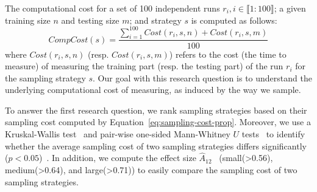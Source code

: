 The computational cost for a set of 100 independent runs $r_{i}, i \in \llbracket 1:100 \rrbracket$; a given training size $n$ and testing size $m$; and strategy $s$ is computed as follows:
\begin{equation}
    CompCost(s) = \frac{\sum_{i=1}^{100} Cost(r_{i}, s, n) + Cost(r_{i}, s, m)}{100}
    \label{eq:sampling-cost-prop}
\end{equation}
where $Cost(r_{i}, s, n)$ (resp. $Cost(r_{i}, s, m)$) refers to the cost (\eg the time to measure) of measuring the training part (resp. the testing part) of the run $r_{i}$ for the sampling strategy $s$. 
Our goal with this research question is to understand the underlying computational cost of measuring, as induced by the way we sample.




To answer the first research question, we rank sampling strategies based on their sampling cost computed by Equation~\ref{eq:sampling-cost-prop}. 
Moreover, we use a Kruskal-Wallis test~\cite{kruskal1952} and pair-wise one-sided Mann-Whitney $U$ tests~\cite{mann1947} to identify whether the average sampling cost of two sampling strategies differs significantly ($p < 0.05$)~\cite{arcuri2011}.
In addition, we compute the effect size $\hat{A}_{12}$~\cite{vargha2000} (small(>0.56), medium(>0.64), and large(>0.71)) to easily compare the sampling cost of two sampling strategies.



